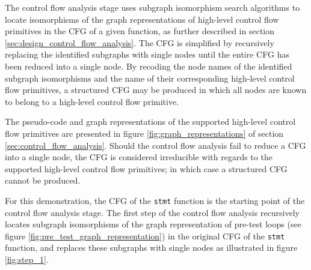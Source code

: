 The control flow analysis stage uses subgraph isomorphism search algorithms to locate isomorphisms of the graph representations of high-level control flow primitives in the CFG of a given function, as further described in section \ref{sec:design_control_flow_analysis}. The CFG is simplified by recursively replacing the identified subgraphs with single nodes until the entire CFG has been reduced into a single node. By recoding the node names of the identified subgraph isomorphisms and the name of their corresponding high-level control flow primitives, a structured CFG may be produced in which all nodes are known to belong to a high-level control flow primitive.

The pseudo-code and graph representations of the supported high-level control flow primitives are presented in figure \ref{fig:graph_representations} of section \ref{sec:control_flow_analysis}. Should the control flow analysis fail to reduce a CFG into a single node, the CFG is considered irreducible with regards to the supported high-level control flow primitives; in which case a structured CFG cannot be produced.

For this demonstration, the CFG of the \texttt{stmt} function is the starting point of the control flow analysis stage. The first step of the control flow analysis recursively locates subgraph isomorphisms of the graph representation of pre-test loops (see figure \ref{fig:pre_test_graph_representation}) in the original CFG of the \texttt{stmt} function, and replaces these subgraphs with single nodes as illustrated in figure \ref{fig:step_1}.

